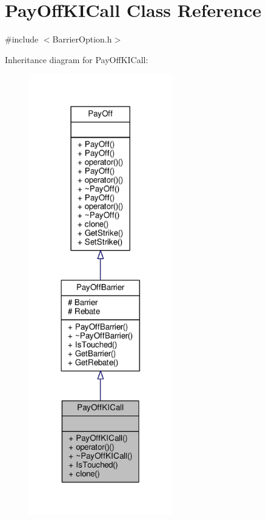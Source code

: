 \hypertarget{classPayOffKICall}{}\section{Pay\+Off\+K\+I\+Call Class Reference}
\label{classPayOffKICall}


{\ttfamily \#include $<$Barrier\+Option.\+h$>$}



Inheritance diagram for Pay\+Off\+K\+I\+Call\+:
\nopagebreak
\begin{figure}[H]
\begin{center}
\leavevmode
\includegraphics[width=177pt]{classPayOffKICall__inherit__graph}
\end{center}
\end{figure}


